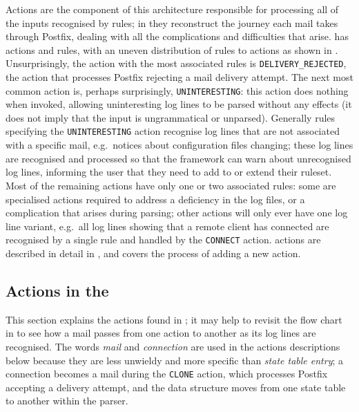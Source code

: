 \label{actions in implementation}

Actions are the component of this architecture responsible for processing
all of the inputs recognised by rules; in \parsername{} they reconstruct
the journey each mail takes through Postfix, dealing with all the
complications and difficulties that arise.  \parsername{} has
\numberOFactions{} actions and \numberOFrules{} rules, with an uneven
distribution of rules to actions as shown in .  Unsurprisingly, the action with the most associated
rules is \texttt{DELIVERY\_REJECTED}, the action that processes Postfix
rejecting a mail delivery attempt.  The next most common action is, perhaps
surprisingly, \texttt{UNINTERESTING}: this action does nothing when
invoked, allowing uninteresting log lines to be parsed without any effects
(it does not imply that the input is ungrammatical or unparsed).  Generally
rules specifying the \texttt{UNINTERESTING} action recognise log lines that
are not associated with a specific mail, e.g.\ notices about configuration
files changing; these log lines are recognised and processed so that the
framework can warn about unrecognised log lines, informing the user that
they need to add to or extend their ruleset.  Most of the remaining actions
have only one or two associated rules: some are specialised actions
required to address a deficiency in the log files, or a complication that
arises during parsing; other actions will only ever have one log line
variant, e.g.\ all log lines showing that a remote client has connected are
recognised by a single rule and handled by the \texttt{CONNECT} action.
\parsernames{} actions are described in detail in , and  covers the process of adding a new action.


\subsection{Actions in the \parsernamelong{}}

\label{actions in detail in implementation}

This section explains the actions found in \parsername{}; it may help to
revisit the flow chart in  to see how a mail passes
from one action to another as its log lines are recognised.  The words
\textit{mail\/} and \textit{connection\/} are used in the actions
descriptions below because they are less unwieldy and more specific than
\textit{state table entry\/}; a connection becomes a mail during the
\texttt{CLONE} action, which processes Postfix accepting a delivery
attempt, and the data structure moves from one state table to another
within the parser.

